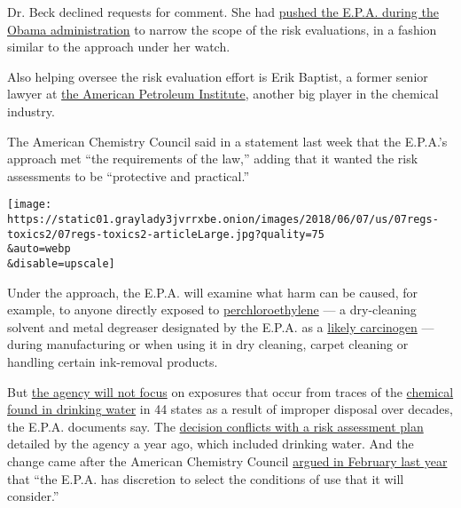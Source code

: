 Dr. Beck declined requests for comment. She had
\href{https://www.documentcloud.org/documents/4496312-How-the-EPA-Revised-the-Way-It-Will-Evaluate.html\#document/p33/a427929}{pushed
the E.P.A. during the Obama administration} to narrow the scope of the
risk evaluations, in a fashion similar to the approach under her watch.

Also helping oversee the risk evaluation effort is Erik Baptist, a
former senior lawyer at
\href{https://www.documentcloud.org/documents/4387727-Erik-Baptist-Financial-Disclosure.html}{the
American Petroleum Institute}, another big player in the chemical
industry.

The American Chemistry Council said in a statement last week that the
E.P.A.'s approach met ``the requirements of the law,'' adding that it
wanted the risk assessments to be ``protective and practical.''

\texttt{[image: https://static01.graylady3jvrrxbe.onion/images/2018/06/07/us/07regs-toxics2/07regs-toxics2-articleLarge.jpg?quality=75\\\&auto=webp\\\&disable=upscale]}

Under the approach, the E.P.A. will examine what harm can be caused, for
example, to anyone directly exposed to
\href{https://www.epa.gov/assessing-and-managing-chemicals-under-tsca/risk-evaluation-perchloroethylene}{perchloroethylene}
--- a dry-cleaning solvent and metal degreaser designated by the E.P.A.
as a
\href{https://www.epa.gov/sites/production/files/2016-09/documents/tetrachloroethylene.pdf}{likely
carcinogen} --- during manufacturing or when using it in dry cleaning,
carpet cleaning or handling certain ink-removal products.

But
\href{https://www.documentcloud.org/documents/4496312-How-the-EPA-Revised-the-Way-It-Will-Evaluate.html\#document/p4/a428062}{the
agency will not focus} on exposures that occur from traces of the
\href{https://www.ewg.org/tapwater/contaminant.php?contamcode=2987\#.Wxkdgu4vwkI}{chemical
found in drinking water} in 44 states as a result of improper disposal
over decades, the E.P.A. documents say. The
\href{https://www.documentcloud.org/documents/4496312-How-the-EPA-Revised-the-Way-It-Will-Evaluate.html\#document/p3/a428061}{decision
conflicts with a risk assessment plan} detailed by the agency a year
ago, which included drinking water. And the change came after the
American Chemistry Council
\href{https://www.documentcloud.org/documents/4496312-How-the-EPA-Revised-the-Way-It-Will-Evaluate.html\#document/p27/a427925}{argued
in February last year} that ``the E.P.A. has discretion to select the
conditions of use that it will consider.''

